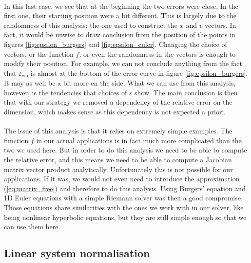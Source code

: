       \paragraph{}
      In this last case, we see that at the beginning the two errors were close.
      In the first one, their starting position were a bit different.
      This is largely due to the randomness of this analysis: the one used to construct the $x$ and $v$ vectors.
      In fact, it would be unwise to draw conclusion from the position of the points in figures \ref{fig:epsilon_burgers} and \ref{fig:epsilon_euler}.
      Changing the choice of vectors, or the function $f$, or even the randomness in the vectors is enough to modify their position.
      For example, we can not conclude anything from the fact that $\varepsilon_\textrm{wp}$ is almost at the bottom of the error curve in figure \ref{fig:epsilon_burgers}.
      It may as well be a bit more en the side.
      What we can use from this analysis, however, is the tendencies that choices of $\varepsilon$ show.
      The main conclusion is then that with our strategy we removed a dependency of the relative error on the dimension, which makes sense as this dependency is not expected a priori.

      \paragraph{}
      The issue of this analysis is that it relies on extremely simple examples.
      The function $f$ in our actual applications is in fact much more complicated than the two we used here.
      But in order to do this analysis we need to be able to compute the relative error, and this means we need to be able to compute a Jacobian matrix vector product analytically.
      Unfortunately this is not possible for our applications.
      If it was, we would not even need to introduce the approximation (\ref{eq:matrix_free}) and therefore to do this analysis.
      Using Burgers' equation and 1D Euler equations with a simple Riemann solver was then a good compromise.
      Those equations share similarities with the ones we work with in our solver, like being nonlinear hyperbolic equations, but they are still simple enough so that we can use them here.


    \subsection{Linear system normalisation}

